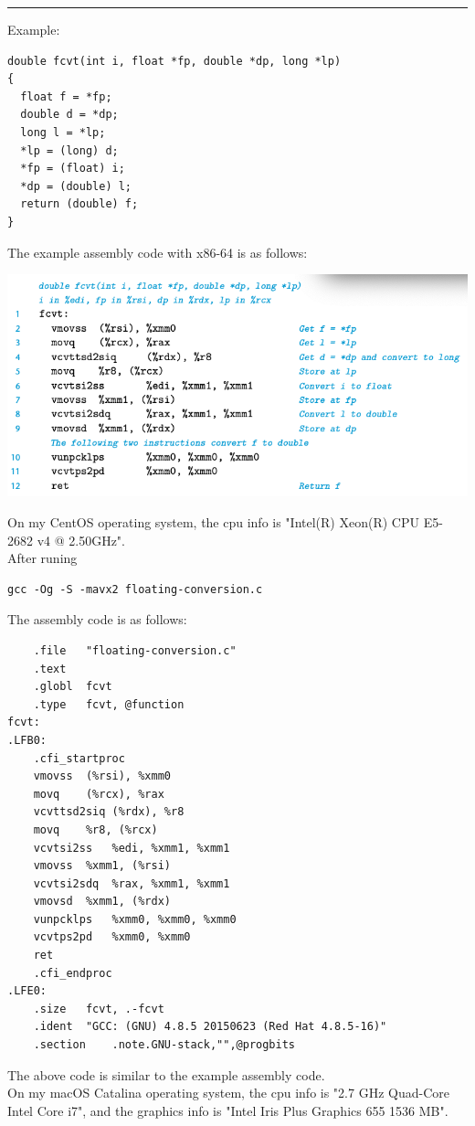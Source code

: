 \documentclass[11pt]{article}
\begin{document}
\noindent\rule{\textwidth}{0.5pt}
Example:\\
\begin{verbatim}
double fcvt(int i, float *fp, double *dp, long *lp)
{
  float f = *fp;
  double d = *dp;
  long l = *lp;
  *lp = (long) d;
  *fp = (float) i;
  *dp = (double) l;
  return (double) f;
}
\end{verbatim}

The example assembly code with x86-64 is as follows:\\
\begin{center}
\includegraphics[width=.9\linewidth]{pics/fcvt-assembly-code.png}
\end{center}



On my CentOS operating system, the cpu info is "Intel(R) Xeon(R) CPU E5-2682 v4 @ 2.50GHz".\\
After runing\\
\begin{verbatim}
gcc -Og -S -mavx2 floating-conversion.c
\end{verbatim}

The assembly code is as follows:\\
\begin{verbatim}
	.file	"floating-conversion.c"
	.text
	.globl	fcvt
	.type	fcvt, @function
fcvt:
.LFB0:
	.cfi_startproc
	vmovss	(%rsi), %xmm0
	movq	(%rcx), %rax
	vcvttsd2siq	(%rdx), %r8
	movq	%r8, (%rcx)
	vcvtsi2ss	%edi, %xmm1, %xmm1
	vmovss	%xmm1, (%rsi)
	vcvtsi2sdq	%rax, %xmm1, %xmm1
	vmovsd	%xmm1, (%rdx)
	vunpcklps	%xmm0, %xmm0, %xmm0
	vcvtps2pd	%xmm0, %xmm0
	ret
	.cfi_endproc
.LFE0:
	.size	fcvt, .-fcvt
	.ident	"GCC: (GNU) 4.8.5 20150623 (Red Hat 4.8.5-16)"
	.section	.note.GNU-stack,"",@progbits
\end{verbatim}

The above code is similar to the example assembly code.\\


On my macOS Catalina operating system, the cpu info is "2.7 GHz Quad-Core Intel Core i7", and the graphics info is "Intel Iris Plus Graphics 655 1536 MB".\\
\end{document}
